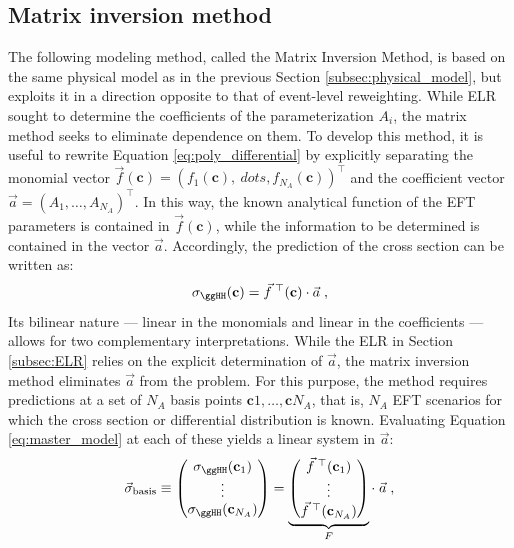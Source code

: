 

\subsection{Matrix inversion method}
\label{subsec:matrix_inversion}
The following modeling method, called the Matrix Inversion Method, is based on the same physical model as in the previous Section \ref{subsec:physical_model}, but exploits it in a direction opposite to that of event-level reweighting. While ELR sought to determine the coefficients of the parameterization $A_i$, the matrix method seeks to eliminate dependence on them. To develop this method, it is useful to rewrite Equation \ref{eq:poly_differential} by explicitly separating the monomial vector $\vec{f}(\mathbf{c}) = (f_1(\mathbf{c}),\ dots,f_{N_A}(\mathbf{c}))^\top$ and the coefficient vector $\vec{a} = (A_1,\dots,A_{N_A})^\top$. In this way, the known analytical function of the EFT parameters is contained in $\vec{f}(\mathbf{c})$, while the information to be determined is contained in the vector $\vec{a}$. Accordingly, the prediction of the cross section can be written as:
%
\begin{equation}
    \sigma_{\ggHH}(\mathbf{c}) = \vec{f}^{\;\top}(\mathbf{c})\cdot\vec{a}\;,
\label{eq:master_model}
\end{equation}
%
Its bilinear nature — linear in the monomials and linear in the coefficients — allows for two complementary interpretations. While the ELR in Section \ref{subsec:ELR} relies on the explicit determination of $\vec{a}$, the matrix inversion method eliminates $\vec{a}$ from the problem. For this purpose, the method requires predictions at a set of $N_A$ basis points ${\mathbf{c}1,\dots,\mathbf{c}{N_A}}$, that is, $N_A$ EFT scenarios for which the cross section or differential distribution is known. Evaluating Equation \ref{eq:master_model} at each of these yields a linear system in $\vec{a}$:
%
\begin{equation}
  \vec{\sigma}_{\text{basis}} \equiv
  \begin{pmatrix}
    \sigma_{\ggHH}(\mathbf{c}_1) \\ \vdots \\ \sigma_{\ggHH}(\mathbf{c}_{N_A})
  \end{pmatrix}
  =
  \underbrace{
  \begin{pmatrix}
    \vec{f}^{\;\top}(\mathbf{c}_1) \\ \vdots \\ \vec{f}^{\;\top}(\mathbf{c}_{N_A})
  \end{pmatrix}}_{F}
  \cdot\;\vec{a}\;,
\label{eq:matrix_system}
\end{equation}
